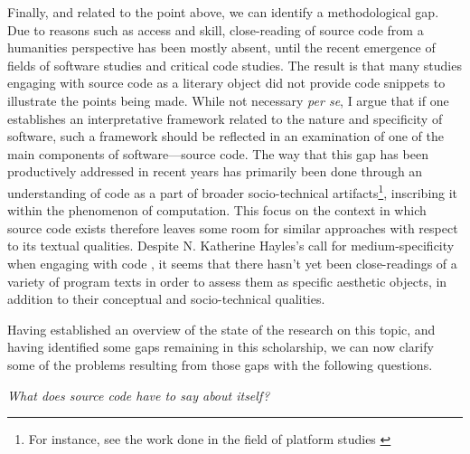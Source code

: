 Finally, and related to the point above, we can identify a methodological gap. Due to reasons such as access and skill, close-reading of source code from a humanities perspective has been mostly absent, until the recent emergence of fields of software studies and critical code studies. The result is that many studies engaging with source code as a literary object did not provide code snippets to illustrate the points being made. While not necessary \emph{per se}, I argue that if one establishes an interpretative framework related to the nature and specificity of software, such a framework should be reflected in an examination of one of the main components of software—source code. The way that this gap has been productively addressed in recent years has primarily been done through an understanding of code as a part of broader socio-technical artifacts\footnote{For instance, see the work done in the field of platform studies \citep{montfort_10_2014}}, inscribing it within the phenomenon of computation. This focus on the context in which source code exists therefore leaves some room for similar approaches with respect to its textual qualities. Despite N. Katherine Hayles's call for medium-specificity when engaging with code \citep{hayles_print_2004}, it seems that there hasn't yet been close-readings of a variety of program texts in order to assess them as specific aesthetic objects, in addition to their conceptual and socio-technical qualities.

Having established an overview of the state of the research on this topic, and having identified some gaps remaining in this scholarship, we can now clarify some of the problems resulting from those gaps with the following questions.

\vspace{1\baselineskip}

\emph{What does source code have to say about itself?}

